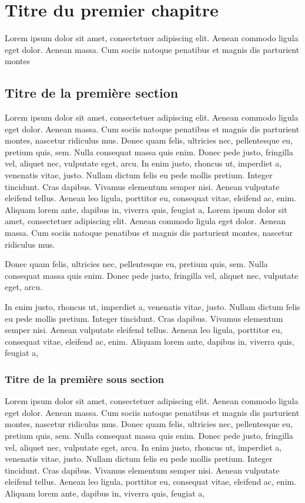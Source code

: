 \documentclass[a4paper,12pt]{report}
\begin{document}
\chapter {Titre du premier chapitre}
\thispagestyle {empty}
Lorem ipsum dolor sit amet, consectetuer
adipiscing elit. Aenean commodo ligula eget dolor. Aenean massa. Cum
sociis natoque penatibus et magnis dis parturient montes

\section {Titre de la première section}

Lorem ipsum dolor sit amet, consectetuer adipiscing elit. Aenean
commodo ligula eget dolor. Aenean massa. Cum sociis natoque
penatibus et magnis dis parturient montes, nascetur ridiculus mus.
Donec quam felis, ultricies nec, pellentesque eu, pretium quis, sem.
Nulla consequat massa quis enim. Donec pede justo, fringilla vel,
aliquet nec, vulputate eget, arcu. In enim justo, rhoncus ut,
imperdiet a, venenatis vitae, justo. Nullam dictum felis eu pede
mollis pretium. Integer tincidunt. Cras dapibus. Vivamus elementum
semper nisi. Aenean vulputate eleifend tellus. Aenean leo ligula,
porttitor eu, consequat vitae, eleifend ac, enim. Aliquam lorem
ante, dapibus in, viverra quis, feugiat a, Lorem ipsum dolor sit
amet, consectetuer adipiscing elit. Aenean commodo ligula eget
dolor. Aenean massa. Cum sociis natoque penatibus et magnis dis
parturient montes, nascetur ridiculus mus.

Donec quam felis, ultricies nec, pellentesque eu, pretium quis, sem.
Nulla consequat massa quis enim. Donec pede justo, fringilla vel,
aliquet nec, vulputate eget, arcu.

In enim justo, rhoncus ut, imperdiet a, venenatis vitae, justo.
Nullam dictum felis eu pede mollis pretium. Integer tincidunt. Cras
dapibus. Vivamus elementum semper nisi. Aenean vulputate eleifend
tellus. Aenean leo ligula, porttitor eu, consequat vitae, eleifend
ac, enim. Aliquam lorem ante, dapibus in, viverra quis, feugiat a,

\subsection {Titre de la première sous section}

Lorem ipsum dolor sit amet, consectetuer adipiscing elit. Aenean
commodo ligula eget dolor. Aenean massa. Cum sociis natoque
penatibus et magnis dis parturient montes, nascetur ridiculus mus.
Donec quam felis, ultricies nec, pellentesque eu, pretium quis, sem.
Nulla consequat massa quis enim. Donec pede justo, fringilla vel,
aliquet nec, vulputate eget, arcu. In enim justo, rhoncus ut,
imperdiet a, venenatis vitae, justo. Nullam dictum felis eu pede
mollis pretium. Integer tincidunt. Cras dapibus. Vivamus elementum
semper nisi. Aenean vulputate eleifend tellus. Aenean leo ligula,
porttitor eu, consequat vitae, eleifend ac, enim. Aliquam lorem
ante, dapibus in, viverra quis, feugiat a,
\end{document}
